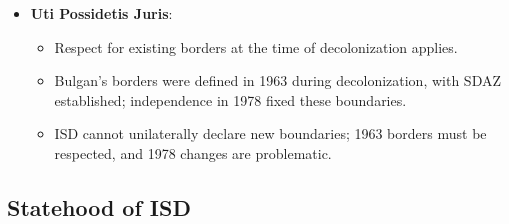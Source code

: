 \begin{itemize}
\begin{itemize}
    \end{itemize}
    \item \textbf{Uti Possidetis Juris}:
    \begin{itemize}
        \item Respect for existing borders at the time of decolonization applies.
        \item Bulgan’s borders were defined in 1963 during decolonization, with SDAZ established; independence in 1978 fixed these boundaries.
        \item ISD cannot unilaterally declare new boundaries; 1963 borders must be respected, and 1978 changes are problematic.
    \end{itemize}
\end{itemize}

\subsection{Statehood of ISD}
